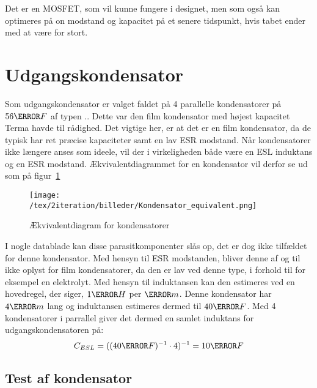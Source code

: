 Det er en MOSFET, som vil kunne fungere i designet, men som også kan optimeres på on modstand og kapacitet på et senere tidspunkt, hvis tabet ender med at være for stort. 

\section{Udgangskondensator}
Som udgangskondensator er valget faldet på 4 parallelle kondensatorer på $56\micro F$ af typen .. Dette var den film kondensator med højest kapacitet Terma havde til rådighed. Det vigtige her, er at det er en film kondensator, da de typisk har ret præcise kapaciteter samt en lav ESR modstand. Når kondensatorer ikke længere anses som ideele, vil der i virkeligheden både være en ESL induktans og en ESR modstand. Ækvivalentdiagrammet for en kondensator vil derfor se ud som på figur~\ref{fig: con_equi} 
\begin{figure}[H]
	\center
	\texttt{[image: /tex/2iteration/billeder/Kondensator\_equivalent.png]}
	\caption{Ækvivalentdiagram for kondensatorer}
	\label{fig: con_equi}
\end{figure}
I nogle datablade kan disse parasitkomponenter slås op, det er dog ikke tilfældet for denne kondensator. Med hensyn til ESR modstanden, bliver denne af og til ikke oplyst for film kondensatorer, da den er lav ved denne type, i forhold til for eksempel en elektrolyt. 
Med hensyn til induktansen kan den estimeres ved en hovedregel, der siger, $1\nano H$ per $\milli m$. Denne kondensator har $4\centi m$ lang og induktansen estimeres dermed til $40\nano F$. Med 4 kondensatorer i parrallel giver det dermed en samlet induktans for udgangskondensatoren på:
\begin{equation} \label{ESL}
C_{ESL} = ((40\nano F)^{-1} \cdot 4)^{-1} = 10\nano F
\end{equation}

\subsection{Test af kondensator}

